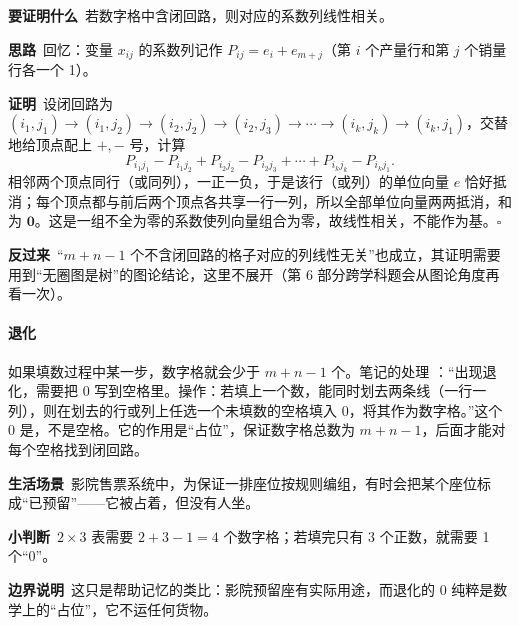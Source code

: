 \begin{supplementbox}
\textbf{要证明什么}\ 若数字格中含闭回路，则对应的系数列线性相关。\par
\textbf{思路}\ 回忆：变量 $x_{ij}$ 的系数列记作 $P_{ij}=e_i+e_{m+j}$（第 $i$ 个产量行和第 $j$ 个销量行各一个 1）。\par
\textbf{证明}\ 设闭回路为 $(i_1,j_1)\to(i_1,j_2)\to(i_2,j_2)\to(i_2,j_3)\to\cdots\to(i_k,j_k)\to(i_k,j_1)$，交替地给顶点配上 $+,-$ 号，计算
\[
P_{i_1j_1}-P_{i_1j_2}+P_{i_2j_2}-P_{i_2j_3}+\cdots+P_{i_kj_k}-P_{i_kj_1}.
\]
相邻两个顶点同行（或同列），一正一负，于是该行（或列）的单位向量 $e$ 恰好抵消；每个顶点都与前后两个顶点各共享一行一列，所以全部单位向量两两抵消，和为 $\mathbf 0$。这是一组不全为零的系数使列向量组合为零，故线性相关，不能作为基。\hfill$\square$\par
\textbf{反过来}\ “$m+n-1$ 个不含闭回路的格子对应的列线性无关”也成立，其证明需要用到“无圈图是树”的图论结论，这里不展开（第 6 部分跨学科题会从图论角度再看一次）。
\end{supplementbox}

\paragraph{退化}
如果填数过程中某一步，数字格就会少于 $m+n-1$ 个。笔记的处理 \orig：“出现退化，需要把 0 写到空格里。操作：若填上一个数，能同时划去两条线（一行一列），则在划去的行或列上任选一个未填数的空格填入 0，将其作为数字格。”这个 0 是，不是空格。它的作用是“占位”，保证数字格总数为 $m+n-1$，后面才能对每个空格找到闭回路。

\begin{lifebox}
\textbf{生活场景}\ 影院售票系统中，为保证一排座位按规则编组，有时会把某个座位标成“已预留”——它被占着，但没有人坐。\par
{}
\textbf{小判断}\ $2\times3$ 表需要 $2+3-1=4$ 个数字格；若填完只有 3 个正数，就需要 1 个“0”。\par
\textbf{边界说明}\ 这只是帮助记忆的类比：影院预留座有实际用途，而退化的 0 纯粹是数学上的“占位”，它不运任何货物。
\end{lifebox}

